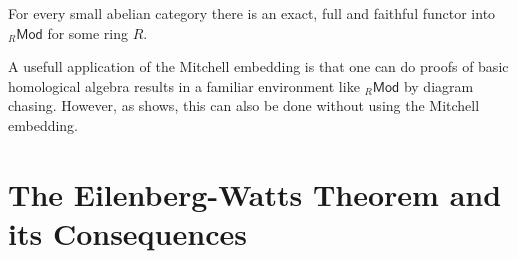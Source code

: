 \begin{theorem}
	For every small abelian category there is an exact, full and faithful functor into $_{R}\mathsf{Mod}$ for some ring $R$.
	\label{thm:mitchell_embedding}
\end{theorem}

A usefull application of the Mitchell embedding is that one can do proofs of basic homological algebra results in a familiar environment like $_{R}\mathsf{Mod}$ by diagram chasing. However, as \cite[202--208]{maclane:categories:1978} shows, this can also be done without using the Mitchell embedding.

\section{The Eilenberg-Watts Theorem and its Consequences}


\printbibliography

